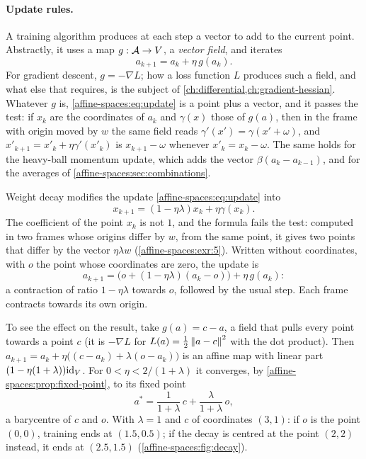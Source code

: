 \begin{notechapter}
\paragraph{Update rules.} A training algorithm produces at each step a
vector to add to the current point. Abstractly, it uses a map
$g:\mathcal{A}\to V$, a \emph{vector field}, and iterates
\begin{equation}\label{affine-spaces:eq:update}
  a_{k+1} = a_k + \eta\,g(a_k) .
\end{equation}
For gradient descent, $g = -\nabla L$; how a loss function $L$ produces
such a field, and what else that requires, is the subject of
\cref{ch:differential,ch:gradient-hessian}. Whatever $g$ is,
\eqref{affine-spaces:eq:update} is a point plus a vector, and it passes the
test: if $x_k$ are the coordinates of $a_k$ and $\gamma(x)$ those of
$g(a)$, then in the frame with origin moved by $w$ the same field reads
$\gamma'(x') = \gamma(x' + \omega)$, and
$x'_{k+1} = x'_k + \eta\gamma'(x'_k)$ is $x_{k+1} - \omega$ whenever
$x'_k = x_k - \omega$. The same holds for the heavy-ball momentum update,
which adds the vector $\beta(a_k - a_{k-1})$, and for the averages of
\cref{affine-spaces:sec:combinations}.

\begin{example}
\label{affine-spaces:ex:decay}
Weight decay modifies the update \eqref{affine-spaces:eq:update} into
\[
  x_{k+1} = (1 - \eta\lambda)x_k + \eta\gamma(x_k) .
\]
The coefficient of the point $x_k$ is not $1$, and the formula fails the
test: computed in two frames whose origins differ by $w$, from the same
point, it gives two points that differ by the vector $\eta\lambda w$
(\cref{affine-spaces:exr:5}). Written without coordinates, with $o$ the
point whose coordinates are zero, the update is
\[
  a_{k+1} = \bigl(o + (1 - \eta\lambda)(a_k - o)\bigr) + \eta\,g(a_k) :
\]
a contraction of ratio $1 - \eta\lambda$ towards $o$, followed by the usual
step. Each frame contracts towards its own origin.

To see the effect on the result, take $g(a) = c - a$, a field that pulls
every point towards a point $c$ (it is $-\nabla L$ for
$L(a) = \frac12\left\|a - c\right\|^2$ with the dot product). Then
$a_{k+1} = a_k + \eta\bigl((c - a_k) + \lambda(o - a_k)\bigr)$ is an affine
map with linear part $(1 - \eta(1 + \lambda))\mathrm{id}_V$. For
$0 < \eta < 2/(1 + \lambda)$ it converges, by
\cref{affine-spaces:prop:fixed-point}, to its fixed point
\[
  a^* = \frac1{1 + \lambda}\,c + \frac\lambda{1 + \lambda}\,o ,
\]
a barycentre of $c$ and $o$. With $\lambda = 1$ and $c$ of coordinates
$(3, 1)$: if $o$ is the point $(0, 0)$, training ends at $(1.5, 0.5)$; if
the decay is centred at the point $(2, 2)$ instead, it ends at
$(2.5, 1.5)$ (\cref{affine-spaces:fig:decay}).
\end{example}


\end{notechapter}
